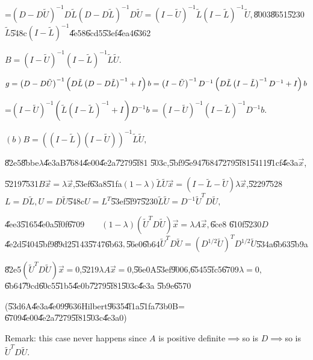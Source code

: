 \documentclass{article}
\begin{document}
=$\left( D-D\tilde{U}\right) ^{-1}D\tilde{L}\left( D-D\tilde{L}\right) ^{-1}D%
\tilde{U}=\left( I-\tilde{U}\right) ^{-1}\tilde{L}\left( I-\tilde{L}\right)
^{-1}\tilde{U},$\U{8003}\U{8651}\U{5230}$\tilde{L}$\U{548c}$\left( I-\tilde{L%
}\right) ^{-1}$\U{4e58}\U{6cd5}\U{53ef}\U{4ea4}\U{6362}

$B=\left( I-\tilde{U}\right) ^{-1}\left( I-\tilde{L}\right) ^{-1}\tilde{L}%
\tilde{U}.$

$g=\left( D-D\tilde{U}\right) ^{-1}\left( D\tilde{L}\left( D-D\tilde{L}%
\right) ^{-1}+I\right) b=\left( I-\tilde{U}\right) ^{-1}D^{-1}\left( D\tilde{%
L}\left( I-\tilde{L}\right) ^{-1}D^{-1}+I\right) b$

=$\left( I-\tilde{U}\right) ^{-1}\left( \tilde{L}\left( I-\tilde{L}\right)
^{-1}+I\right) D^{-1}b=\left( I-\tilde{U}\right) ^{-1}\left( I-\tilde{L}%
\right) ^{-1}D^{-1}b.$

$\left( b\right) B=\left( \left( I-\tilde{L}\right) \left( I-\tilde{U}%
\right) \right) ^{-1}\tilde{L}\tilde{U},$

\U{82e5}\U{8bbe}$\lambda $\U{4e3a}B\U{7684}\U{4e00}\U{4e2a}\U{7279}\U{5f81}%
\U{503c},\U{5bf9}\U{5e94}\U{7684}\U{7279}\U{5f81}\U{5411}\U{91cf}\U{4e3a}$%
\vec{x}$,

\U{5219}\U{7531}$B\vec{x}=\lambda \vec{x}$,\U{53ef}\U{63a8}\U{51fa}$\left(
1-\lambda \right) \tilde{L}\tilde{U}\vec{x}=\left( I-\tilde{L}-\tilde{U}%
\right) \lambda \vec{x}$,\U{5229}\U{7528}$L=D\tilde{L},U=D\tilde{U}$\U{548c}$%
U=L^{T}$\U{53ef}\U{5f97}\U{5230}$\tilde{L}\tilde{U}=D^{-1}\tilde{U}^{T}D%
\tilde{U},$

\U{4ee3}\U{5165}\U{4e0a}\U{5f0f}\U{6709}$\qquad \left( 1-\lambda \right)
\left( \tilde{U}^{T}D\tilde{U}\right) \vec{x}=\lambda A\vec{x},$\U{6ce8}%
\U{610f}\U{5230}$D$\U{4e2d}\U{5404}\U{5bf9}\U{89d2}\U{5143}\U{5747}\U{6b63}$%
, $\U{56e0}\U{6b64}$\tilde{U}^{T}D\tilde{U}=\left( D^{1/2}\tilde{U}\right)
^{T}D^{1/2}\tilde{U}$\U{534a}\U{6b63}\U{5b9a}

\U{82e5}$\left( \tilde{U}^{T}D\tilde{U}\right) \vec{x}=0$,\U{5219}$\lambda A%
\vec{x}=0$,\U{56e0}A\U{53ef}\U{9006},\U{6545}\U{5fc5}\U{6709}$\lambda =0,$%
\U{6b64}\U{79cd}\U{60c5}\U{51b5}\U{4e0b}\U{7279}\U{5f81}\U{503c}\U{4e3a}%
\U{5b9e}\U{6570}

(\U{53d6}A\U{4e3a}\U{4e09}\U{9636}Hilbert\U{9635}\U{4f1a}\U{51fa}\U{73b0}B=%
\U{6709}\U{4e00}\U{4e2a}\U{7279}\U{5f81}\U{503c}\U{4e3a}0)

Remark: this case never happens since $A$ is positive definite$\implies $so
is $D\implies $so is $\tilde{U}^{T}D\tilde{U}.$
\end{document}
